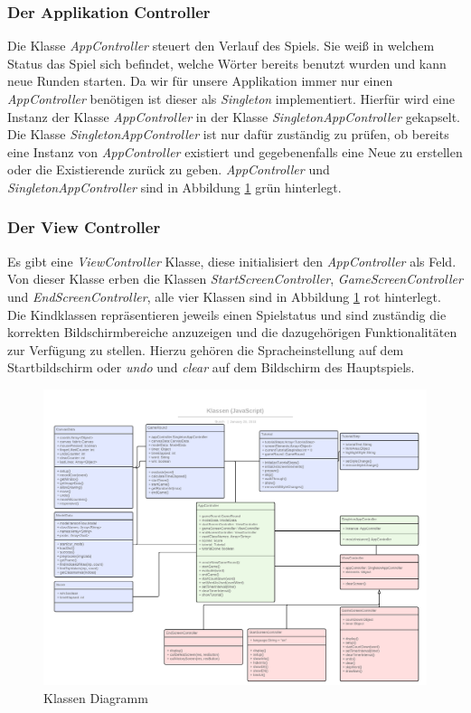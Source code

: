 \documentclass[11pt]{article}
\begin{document}
\subsubsection{Der Applikation Controller}
Die Klasse \textit{AppController} steuert den Verlauf des Spiels. Sie weiß in welchem Status das Spiel sich befindet, welche Wörter bereits benutzt wurden und kann neue Runden starten. Da wir für unsere Applikation immer nur einen \textit{AppController} benötigen ist dieser als \textit{Singleton} implementiert. Hierfür wird eine Instanz der Klasse \textit{AppController} in der Klasse \textit{SingletonAppController} gekapselt. Die Klasse \textit{SingletonAppController} ist nur dafür zuständig zu prüfen, ob bereits eine Instanz von \textit{AppController} existiert und gegebenenfalls eine Neue zu erstellen oder die Existierende zurück zu geben. \textit{AppController} und \textit{SingletonAppController} sind in Abbildung \ref{fig:classDiagram} grün hinterlegt.

\subsubsection{Der View Controller}
Es gibt eine \textit{ViewController} Klasse, diese initialisiert den \textit{AppController} als Feld. Von dieser Klasse erben die Klassen \textit{StartScreenController}, \textit{GameScreenController} und \textit{EndScreenController}, alle vier Klassen sind in Abbildung \ref{fig:classDiagram} rot hinterlegt. Die Kindklassen repräsentieren jeweils einen Spielstatus und sind zuständig die korrekten Bildschirmbereiche anzuzeigen und die dazugehörigen Funktionalitäten zur Verfügung zu stellen. Hierzu gehören die Spracheinstellung auf dem Startbildschirm oder \textit{undo} und \textit{clear} auf dem Bildschirm des Hauptspiels.

\begin{figure}[ht]
\centering
\includegraphics[width=1\textwidth]{images/classDiagramSkribbl.png}
\caption{\label{fig:classDiagram}Klassen Diagramm}
\end{figure}
\end{document}
